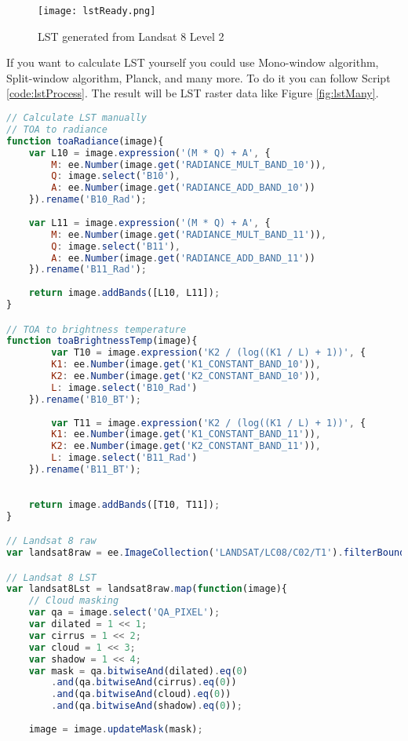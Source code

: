 \begin{figure}[htbp]
	\label{fig:lstReady}
	\centering
	\texttt{[image: lstReady.png]}
	\caption{LST generated from Landsat 8 Level 2}
\end{figure}

If you want to calculate LST yourself you could use Mono-window algorithm, Split-window algorithm, Planck, and many more. To do it you can follow Script \ref{code:lstProcess}. The result will be LST raster data like Figure \ref{fig:lstMany}.

\begin{lstlisting}[language=JavaScript, label={code:lstProcess}, caption={GEE Script to calculate LST manually}]
// Calculate LST manually
// TOA to radiance
function toaRadiance(image){
	var L10 = image.expression('(M * Q) + A', {
		M: ee.Number(image.get('RADIANCE_MULT_BAND_10')),
		Q: image.select('B10'),
		A: ee.Number(image.get('RADIANCE_ADD_BAND_10'))
	}).rename('B10_Rad');
	
	var L11 = image.expression('(M * Q) + A', {
		M: ee.Number(image.get('RADIANCE_MULT_BAND_11')),
		Q: image.select('B11'),
		A: ee.Number(image.get('RADIANCE_ADD_BAND_11'))
	}).rename('B11_Rad');
	
	return image.addBands([L10, L11]);
}

// TOA to brightness temperature
function toaBrightnessTemp(image){
		var T10 = image.expression('K2 / (log((K1 / L) + 1))', {
		K1: ee.Number(image.get('K1_CONSTANT_BAND_10')),
		K2: ee.Number(image.get('K2_CONSTANT_BAND_10')),
		L: image.select('B10_Rad')
	}).rename('B10_BT');
	
		var T11 = image.expression('K2 / (log((K1 / L) + 1))', {
		K1: ee.Number(image.get('K1_CONSTANT_BAND_11')),
		K2: ee.Number(image.get('K2_CONSTANT_BAND_11')),
		L: image.select('B11_Rad')
	}).rename('B11_BT');
	
	
	return image.addBands([T10, T11]);
}

// Landsat 8 raw
var landsat8raw = ee.ImageCollection('LANDSAT/LC08/C02/T1').filterBounds(roi).filterDate('2022-01-01', '2022-12-31');

// Landsat 8 LST
var landsat8Lst = landsat8raw.map(function(image){
	// Cloud masking
	var qa = image.select('QA_PIXEL');
	var dilated = 1 << 1;
	var cirrus = 1 << 2;
	var cloud = 1 << 3;
	var shadow = 1 << 4;
	var mask = qa.bitwiseAnd(dilated).eq(0)
		.and(qa.bitwiseAnd(cirrus).eq(0))
		.and(qa.bitwiseAnd(cloud).eq(0))
		.and(qa.bitwiseAnd(shadow).eq(0));
	
	image = image.updateMask(mask);
	

\end{lstlisting}
